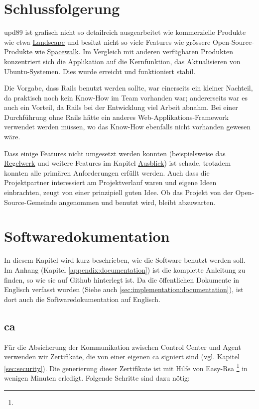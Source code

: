 \section{Schlussfolgerung}
\label{conclusion}

\gls{upd89} ist grafisch nicht so detailreich ausgearbeitet wie kommerzielle Produkte wie etwa \hyperref[sec:analysis:competition:landscape]{Landscape} und besitzt nicht so viele Features wie grössere Open-Source-Produkte wie \hyperref[sec:analysis:competition:spacewalk]{Spacewalk}. Im Vergleich mit anderen verfügbaren Produkten konzentriert sich die Applikation auf die Kernfunktion, das Aktualisieren von Ubuntu-Systemen. Dies wurde erreicht und funktioniert stabil.

Die Vorgabe, dass Rails benutzt werden sollte, war einerseits ein kleiner Nachteil, da praktisch noch kein Know-How im Team vorhanden war; andererseits war es auch ein Vorteil, da Rails bei der Entwicklung viel Arbeit abnahm. Bei einer Durchführung ohne Rails hätte ein anderes Web-Applikations-Framework verwendet werden müssen, wo das Know-How ebenfalls nicht vorhanden gewesen wäre.

Dass einige Features nicht umgesetzt werden konnten (beispielsweise das \hyperref[sec:ausblick:regelwerk]{Regelwerk} und weitere Features im Kapitel \hyperref[sec:ausblick]{Ausblick}) ist schade, trotzdem konnten alle primären Anforderungen erfüllt werden. Auch dass die Projektpartner interessiert am Projektverlauf waren und eigene Ideen einbrachten, zeugt von einer prinzipiell guten Idee. Ob das Projekt von der Open-Source-Gemeinde angenommen und benutzt wird, bleibt abzuwarten.

\section{Softwaredokumentation} \label{documentation}

In diesem Kapitel wird kurz beschrieben, wie die Software benutzt werden soll. Im Anhang (Kapitel \ref{appendix:documentation}) ist die komplette Anleitung zu finden, so wie sie auf Github hinterlegt ist. Da die öffentlichen Dokumente in Englisch verfasst wurden (Siehe auch \ref{sec:implementation:documentation}), ist dort auch die Softwaredokumentation auf Englisch.

\subsection{\gls{ca}}
Für die Absicherung der Kommunikation zwischen Control Center und Agent verwenden wir Zertifikate, die von einer eigenen \gls{ca} signiert sind (vgl. Kapitel \ref{sec:security}). Die generierung dieser Zertifikate ist mit Hilfe von Easy-Rsa \footnote{} in wenigen Minuten erledigt. Folgende Schritte sind dazu nötig:

